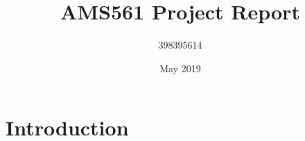 \documentclass{article}
\title{AMS561 Project Report}
\author{398395614 }
\date{May 2019}
\begin{document}
\maketitle

\section{Introduction}
\end{document}
